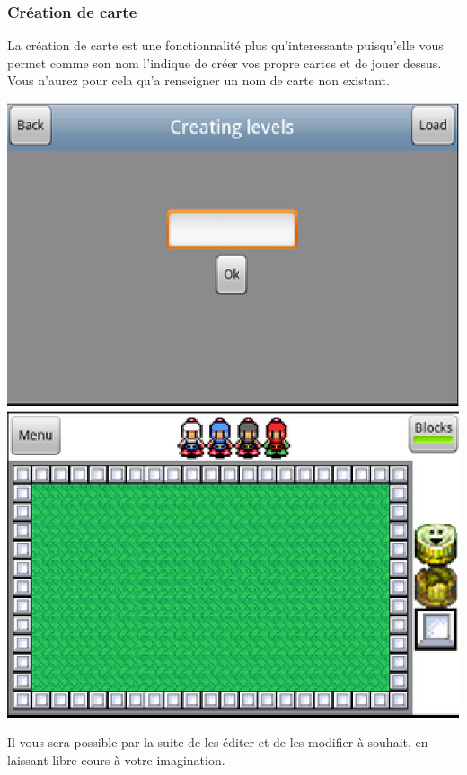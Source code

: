 	\subsubsection{Création de carte}
	La création de carte est une fonctionnalité plus qu'interessante puisqu'elle
	vous permet comme son nom l'indique de créer vos propre cartes et de jouer
	dessus. Vous n'aurez pour cela qu'a renseigner un nom de carte non existant. 
	\begin{center}						
			\includegraphics[scale=0.6]{Developpement/Img/10.eps}
			\includegraphics[scale=0.6]{Developpement/Img/11.eps}
		\end{center}
	Il vous sera possible par la suite de les éditer et de les modifier à souhait,
	en laissant libre cours à votre imagination.
	
	
